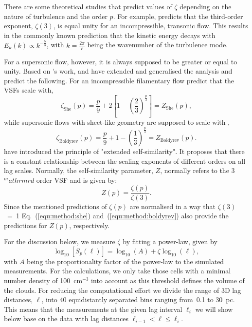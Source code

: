 There are some theoretical studies that predict values of $\zeta$ depending on the nature of turbulence and the order $p$.
For example, \citet{Kolmogorov1941} predicts that the third-order exponent, $\zeta(3)$, is equal unity for an incompressible, transonic flow.
This results in the commonly known prediction that the kinetic energy decays with $E_k(k) \propto k^{-\frac{5}{3}}$, with $k = \frac{2 \pi}{\ell}$ being the wavenumber of the turbulence mode.

For a supersonic flow, however, it is always supposed to be greater or equal to unity.
Based on \citeauthor{Kolmogorov1941}'s work, \citet{She1994} and \citet{Boldyrev2002} have extended and generalised the analysis and predict the following.
For an incompressible filamentary flow \citet{She1994} predict that the VSFs scale with,
\begin{equation}
	\zeta_\mathrm{She}(p) = \frac{p}{9} + 2 \left[ 1 - \left( \frac{2}{3} \right)^{\frac{p}{3}} \right] = Z_\mathrm{She}(p) ,
    \label{equ:method:she}
\end{equation}
while supersonic flows with sheet-like geometry are supposed to scale with \citep{Boldyrev2002},
\begin{equation}
	 \zeta_\mathrm{Boldyrev}(p) = \frac{p}{9} + 1 - \left( \frac{1}{3} \right)^{\frac{p}{3}} = Z_\mathrm{Boldyrev}(p) .
    \label{equ:method:boldyrev}
\end{equation}
\citet{Benzi1993} have introduced the principle of "extended self-similarity".
It proposes that there is a constant relationship between the scaling exponents of different orders on all lag scales. Normally, the self-similarity parameter, $Z$, normally refers to the 3$^mathrm{rd}$ order VSF and is given by:
\begin{equation}
	Z(p) = \frac{\zeta(p)}{\zeta(3)} .
	\label{equ:method:z_def}
\end{equation} 
Since the mentioned predictions of $\zeta(p)$ are normalised in a way that $\zeta(3)$~=~1 Eq.~(\ref{equ:method:she}) and~(\ref{equ:method:boldyrev}) also provide the predictions for $Z(p)$, respectively.

For the discussion below, we measure $\zeta$ by fitting a power-law, given by
\begin{equation}
	\log_{10}\left[ S_p(\ell) \right] = \log_{10}\left(A\right) + \zeta \log_{10}(\ell) ,
    \label{equ:method:fitting}
\end{equation}
with $A$ being the proportionality factor of the power-law to the simulated measurements.
For the calculations, we only take those cells with a minimal number density of 100~cm$^{-3}$ into account as this threshold defines the volume of the clouds.
For reducing the computational effort we divide the range of 3D lag distances, $\ell$, into 40 equidistantly separated bins ranging from~0.1 to 30~pc.
This means that the measurements at the given lag interval $\ell_i$ we will show below base on the data with lag distances $\ell_{i-1} < \ell \leq \ell_i$.

